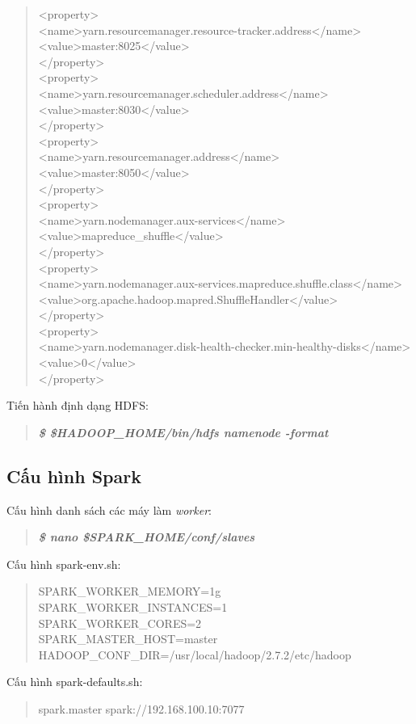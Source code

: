 \begin{quote}
	<property>\\
	<name>yarn.resourcemanager.resource-tracker.address</name>\\
	<value>master:8025</value>\\
	</property>\\
	<property>\\
	<name>yarn.resourcemanager.scheduler.address</name>\\
	<value>master:8030</value>\\
	</property>\\
	<property>\\
	<name>yarn.resourcemanager.address</name>\\
	<value>master:8050</value>\\
	</property>\\
	<property>\\
	<name>yarn.nodemanager.aux-services</name>\\
	<value>mapreduce\_shuffle</value>\\
	</property>\\
	<property>\\
	<name>yarn.nodemanager.aux-services.mapreduce.shuffle.class</name>\\
	<value>org.apache.hadoop.mapred.ShuffleHandler</value>\\
	</property>\\
	<property>\\
	<name>yarn.nodemanager.disk-health-checker.min-healthy-disks</name>\\
	<value>0</value>\\
	</property>
	
\end{quote}

Tiến hành định dạng HDFS:
\begin{quote}
	\textbf{\textit{\$ \$HADOOP\_HOME/bin/hdfs namenode -format}}
\end{quote}

\subsection{Cấu hình Spark}
Cấu hình danh sách các máy làm \textit{worker}:
\begin{quote}
	\textbf{\textit{\$ nano \$SPARK\_HOME/conf/slaves}}
\end{quote}
Cấu hình spark-env.sh:
\begin{quote}
	SPARK\_WORKER\_MEMORY=1g\\
	SPARK\_WORKER\_INSTANCES=1\\
	SPARK\_WORKER\_CORES=2\\
	SPARK\_MASTER\_HOST=master\\
	HADOOP\_CONF\_DIR=/usr/local/hadoop/2.7.2/etc/hadoop
\end{quote}
Cấu hình spark-defaults.sh:
\begin{quote}
	spark.master                     spark://192.168.100.10:7077
\end{quote}

